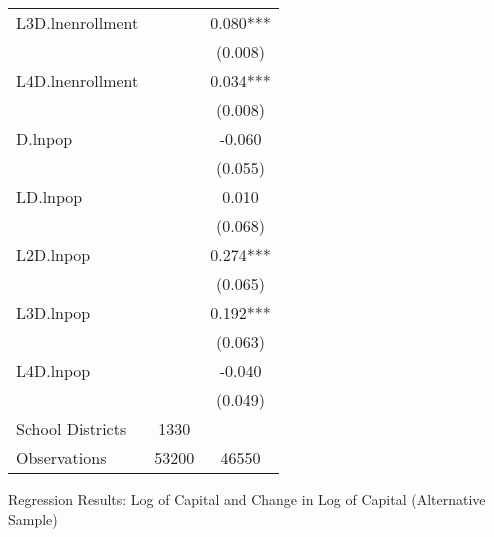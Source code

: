 \begin{tabular}{lcc}
L3D.lnenrollment    &  & 0.080*** \\
                    &  & (0.008) \\
L4D.lnenrollment    &  & 0.034*** \\
                    &  & (0.008) \\
D.lnpop             &  & -0.060 \\
                    &  & (0.055) \\
LD.lnpop            &  & 0.010 \\
                    &  & (0.068) \\
L2D.lnpop           &  & 0.274*** \\
                    &  & (0.065) \\
L3D.lnpop           &  & 0.192*** \\
                    &  & (0.063) \\
L4D.lnpop           &  & -0.040 \\
                    &  & (0.049) \\
\hline
School Districts    & 1330 & \\
Observations        & 53200 & 46550 \\
\hline
\end{tabular}
\caption{Regression Results: Log of Capital and Change in Log of Capital (Alternative Sample)}

